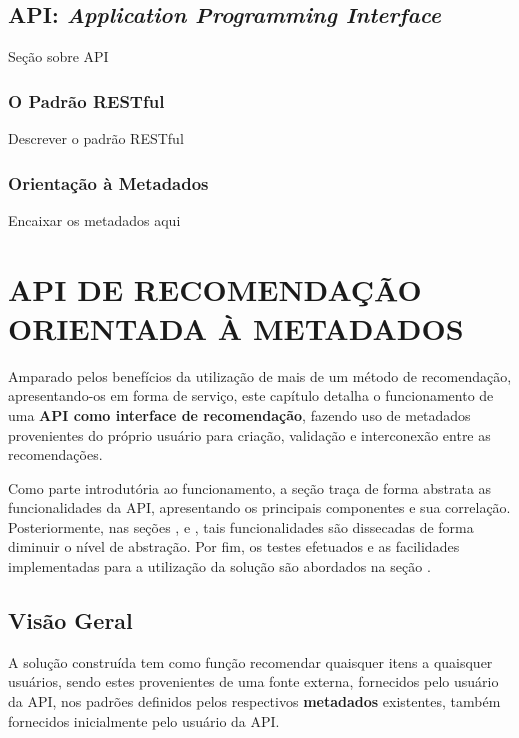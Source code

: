 \documentclass[12pt, openright, oneside, a4paper, brazil]{abntex2}
\begin{document}
\section{API: \textit{Application Programming Interface}}

Seção sobre API

\subsection{O Padrão RESTful}

Descrever o padrão RESTful

\subsection{Orientação à Metadados}

Encaixar os metadados aqui

%
%

\chapter{API DE RECOMENDAÇÃO ORIENTADA À METADADOS}

Amparado pelos benefícios da utilização de mais de um método de recomendação, apresentando-os em forma de serviço, este capítulo detalha o funcionamento de uma \textbf{API como interface de recomendação}, fazendo uso de metadados provenientes do próprio usuário para criação, validação e interconexão entre as recomendações.

Como parte introdutória ao funcionamento, a seção  traça de forma abstrata as funcionalidades da API, apresentando os principais componentes e sua correlação. Posteriormente, nas seções ,  e , tais funcionalidades são dissecadas de forma diminuir o nível de abstração. Por fim, os testes efetuados e as facilidades implementadas para a utilização da solução são abordados na seção .

\section{Visão Geral} \label{visao_geral}

A solução construída tem como função recomendar quaisquer itens a quaisquer usuários, sendo estes provenientes de uma fonte externa, fornecidos pelo usuário da API, nos padrões definidos pelos respectivos \textbf{metadados} existentes, também fornecidos inicialmente pelo usuário da API.
\end{document}
